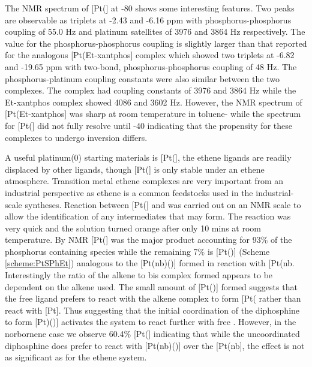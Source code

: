 The \phosphorus{} NMR spectrum of [Pt(\Phthixantphos{}] at -80 \degC{} shows some interesting features.  Two peaks are observable as triplets at -2.43 and -6.16 ppm with phosphorus-phosphorus coupling of 55.0 Hz and platinum satellites of 3976 and 3864 Hz respectively.  The value for the phosphorus-phosphorus coupling is slightly larger than that reported for the analogous [Pt(Et-xantphos] complex which showed two triplets at -6.82 and -19.65 ppm with two-bond, phosphorus-phosphorus coupling of 48 Hz.\cite{Miedaner2004}  The phosphorus-platinum coupling constants were also similar between the two complexes.  The \Phthixantphos{} complex had coupling constants of 3976 and 3864 Hz while the Et-xantphos complex showed 4086 and 3602 Hz.  However, the \phosphorus{} NMR spectrum of [Pt(Et-xantphos] was sharp at room temperature in toluene- while the spectrum for [Pt(\Phthixantphos{}] did not fully resolve until -40 \degC{} indicating that the propensity for these complexes to undergo inversion differs.\cite{Miedaner2004}

A useful platinum(0) starting materials is [Pt(], the ethene ligands are readily displaced by other ligands, though [Pt(] is only stable under an ethene atmosphere.\cite{Harrison1978, Howard1983} Transition metal ethene complexes are very important from an industrial perspective as ethene is a common feedstocks used in the industrial-scale syntheses.\cite{Yoneda2001, Degnan2001}  Reaction between [Pt(] and \Phthixantphos{} was carried out on an NMR scale to allow the identification of any intermediates that may form.  The reaction was very quick and the solution turned orange after only 10 mins at room temperature.  By \phosphorus{} NMR [Pt(\Phthixantphos{}] was the major product accounting for 93\% of the phosphorus containing species while the remaining 7\% is [Pt(\Phthixantphos)] (Scheme \ref{scheme:PtSPhEt}) analogous to the [Pt(nb)(\Phthixantphos)] formed in reaction with [Pt(nb\ce{)3]}.  Interestingly the ratio of the alkene to bis complex formed appears to be dependent on the alkene used.  The small amount of [Pt(\Phthixantphos)] formed suggests that the free ligand prefers to react with the alkene complex to form [Pt(\Phthixantphos\ce{)2]} rather than react with [Pt].  Thus suggesting that the initial coordination of the diphosphine to form [Pt)(\Phthixantphos)] activates the system to react further with free \Phthixantphos.  However, in the norbornene case we observe 60.4\% [Pt(\Phthixantphos{}] indicating that while the uncoordinated diphosphine does prefer to react with [Pt(nb)(\Phthixantphos)] over the [Pt(nb], the effect is not as significant as for the ethene system.  

